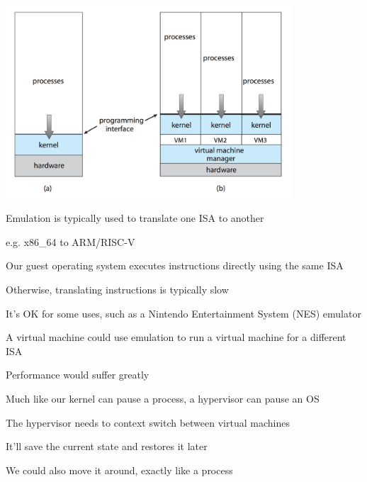   \begin{slide}
    

    \begin{center}
      \includegraphics[width=0.8\textwidth]{non-virtual-machine.png}
    \end{center}

  \end{slide}

  \begin{slide}


    Emulation is typically used to translate one ISA to another

    \leftspace{}e.g. x86\_64 to ARM/RISC-V
    \medskip

    Our guest operating system executes instructions directly using the same ISA

    \leftspace{}Otherwise, translating instructions is typically slow
    \medskip

    It's OK for some uses, such as a Nintendo Entertainment System (NES)
    emulator
    \medskip

    A virtual machine could use emulation to run a virtual machine for a
    different ISA

    \leftspace{}Performance would suffer greatly

  \end{slide}

  \begin{slide}


    Much like our kernel can pause a process, a hypervisor can pause an OS
    \medskip

    The hypervisor needs to context switch between  virtual machines

    \leftspace{}It'll save the current state and restores it later
    \medskip

    We could also move it around, exactly like a process

  \end{slide}

